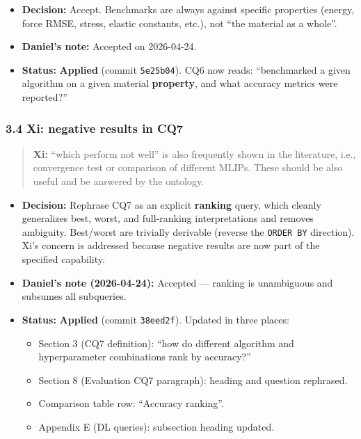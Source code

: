 \begin{itemize}
\tightlist
\item
  \textbf{Decision:} Accept. Benchmarks are always against specific properties (energy, force RMSE, stress, elastic constants, etc.), not ``the material as a whole''.
\item
  \textbf{Daniel's note:} Accepted on 2026-04-24.
\item
  \textbf{Status:} {\color{green!60!black}\faCheckCircle} \textbf{Applied} (commit \texttt{5e25b04}). CQ6 now reads: ``benchmarked a given algorithm on a given material \textbf{property}, and what accuracy metrics were reported?''
\end{itemize}

\subsubsection{3.4 Xi: negative results in CQ7}\label{xi-negative-results-in-cq7}

\begin{quote}
\textbf{Xi:} ``which perform not well'' is also frequently shown in the literature, i.e., convergence test or comparison of different MLIPs. These should be also useful and be answered by the ontology.
\end{quote}

\begin{itemize}
\tightlist
\item
  \textbf{Decision:} Rephrase CQ7 as an explicit \textbf{ranking} query, which cleanly generalizes best, worst, and full-ranking interpretations and removes ambiguity. Best/worst are trivially derivable (reverse the \texttt{ORDER\ BY} direction). Xi's concern is addressed because negative results are now part of the specified capability.
\item
  \textbf{Daniel's note (2026-04-24):} Accepted --- ranking is unambiguous and subsumes all subqueries.
\item
  \textbf{Status:} {\color{green!60!black}\faCheckCircle} \textbf{Applied} (commit \texttt{38eed2f}). Updated in three places:

  \begin{itemize}
  \tightlist
  \item
    Section 3 (CQ7 definition): ``how do different algorithm and hyperparameter combinations rank by accuracy?''
  \item
    Section 8 (Evaluation CQ7 paragraph): heading and question rephrased.
  \item
    Comparison table row: ``Accuracy ranking''.
  \item
    Appendix E (DL queries): subsection heading updated.
  \end{itemize}
\end{itemize}

